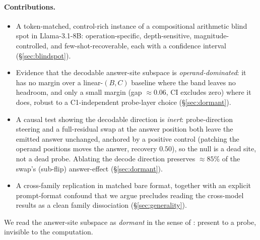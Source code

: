 \paragraph{Contributions.}
\begin{itemize}[topsep=2pt,itemsep=1pt,leftmargin=1.2em]
\item A token-matched, control-rich instance of a compositional arithmetic blind spot
in Llama-3.1-8B: operation-specific, depth-sensitive, magnitude-controlled, and
few-shot-recoverable, each with a confidence interval (\S\ref{sec:blindspot}).
\item Evidence that the decodable answer-site subspace is \emph{operand-dominated}:
it has no margin over a linear-$(B,C)$ baseline where the band leaves no headroom, and
only a small margin (gap $\approx 0.06$, CI excludes zero) where it does, robust to a
C1-independent probe-layer choice (\S\ref{sec:dormant}).
\item A causal test showing the decodable direction is \emph{inert}: probe-direction
steering and a full-residual swap at the answer position both leave the emitted answer unchanged,
anchored by a positive control (patching the operand positions moves the answer, recovery
$0.50$), so the null is a dead site, not a dead probe. Ablating the decode direction preserves
$\approx 85\%$ of the swap's (sub-flip) answer-effect (\S\ref{sec:dormant}).
\item A cross-family replication in matched bare format, together with an explicit
prompt-format confound that we argue precludes reading the cross-model results as a
clean family dissociation (\S\ref{sec:generality}).
\end{itemize}

We read the answer-site subspace as \emph{dormant} in the sense of
\citet{makelov-etal-2024-subspace}: present to a probe, invisible to the computation.

